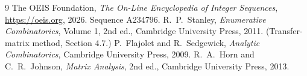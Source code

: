 \documentclass[11pt,a4paper]{article}
\theoremstyle{plain}
\theoremstyle{definition}
\begin{document}
\begin{thebibliography}{9}
 The OEIS Foundation, \emph{The On-Line Encyclopedia of Integer
Sequences}, \url{https://oeis.org}, 2026. Sequence A234796.
 R.~P.~Stanley, \emph{Enumerative Combinatorics}, Volume 1, 2nd ed.,
Cambridge University Press, 2011. (Transfer-matrix method, Section 4.7.)
 P.~Flajolet and R.~Sedgewick, \emph{Analytic Combinatorics}, Cambridge
University Press, 2009.
 R.~A.~Horn and C.~R.~Johnson, \emph{Matrix Analysis}, 2nd ed., Cambridge
University Press, 2013.
\end{thebibliography}
\end{document}
